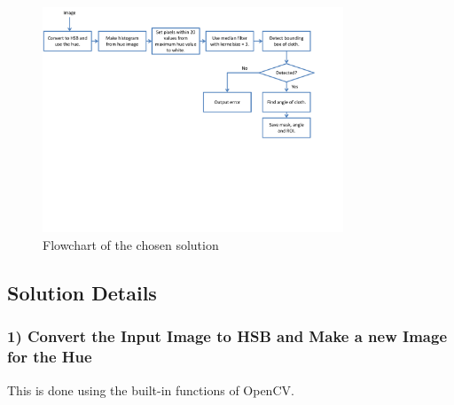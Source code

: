 
\begin{figure}[htpb]
\begin{center}
\leavevmode
\includegraphics[width=0.8\textwidth]{images/tabledetect_flowchart}
\end{center}
\caption{Flowchart of the chosen solution}
\label{fig:tabledetect_flowchart}
\end{figure}

\subsection{Solution Details}
\subsubsection{1) Convert the Input Image to HSB and Make a new Image for the Hue}
This is done using the built-in functions of OpenCV.

